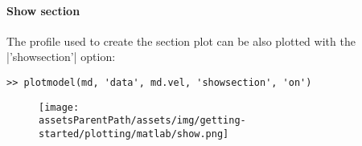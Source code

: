 \paragraph{Show section}
The profile used to create the section plot can be also plotted with the \lstinlinebg|'showsection'| option:
\begin{lstlisting}
>> plotmodel(md, 'data', md.vel, 'showsection', 'on')
\end{lstlisting}
\begin{figure}[H]
	\begin{center}
		\texttt{[image: \\assetsParentPath/assets/img/getting-started/plotting/matlab/show.png]}
	\end{center}
\end{figure}

\clearpage %
